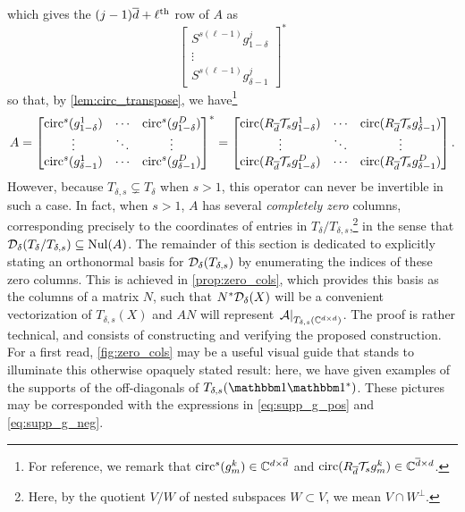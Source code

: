 which gives the $(j - 1) \overline{d} + \ell^{\text{th}}$ row of $A$ as \[\begin{bmatrix} S^{s (\ell - 1)} g_{1 - \delta}^j \\ \vdots \\ S^{s (\ell - 1)} g_{\delta - 1}^j \end{bmatrix}^*\] so that, by \cref{lem:circ_transpose}, we have\footnote{For reference, we remark that $\operatorname{circ}^s(g_m^k) \in \mathbb{C}^{d \times \overline{d}}$ and $\operatorname{circ}(R_{\overline{d}} \mathcal{T}_s g_m^k) \in \mathbb{C}^{\overline{d} \times d}$.} \begin{equation} A = \begin{bmatrix} \operatorname{circ}^s(g_{1 - \delta}^1) & \cdots & \operatorname{circ}^s(g_{1 - \delta}^D) \\ \vdots & \ddots & \vdots \\ \operatorname{circ}^s(g_{\delta - 1}^1) & \cdots & \operatorname{circ}^s(g_{\delta - 1}^D) \end{bmatrix}^* = \begin{bmatrix} \operatorname{circ}(R_{\overline{d}} \mathcal{T}_s g_{1 - \delta}^1) & \cdots & \operatorname{circ}(R_{\overline{d}} \mathcal{T}_s g_{\delta - 1}^1) \\ \vdots & \ddots & \vdots \\ \operatorname{circ}(R_{\overline{d}} \mathcal{T}_s g_{1 - \delta}^D) & \cdots & \operatorname{circ}(R_{\overline{d}} \mathcal{T}_s g_{\delta - 1}^D) \end{bmatrix}. \label{eq:A_block_ptych} \end{equation}  However, because $T_{\delta, s} \subsetneq T_\delta$ when $s > 1$, this operator can never be invertible in such a case.  In fact, when $s > 1$, $A$ has several \emph{completely zero} columns, corresponding precisely to the coordinates of entries in $T_\delta / T_{\delta, s}$,\footnote{Here, by the quotient $V / W$ of nested subspaces $W \subset V$, we mean $V \cap W^\perp$.} in the sense that $\mathcal{D}_\delta(T_\delta / T_{\delta, s}) \subseteq \operatorname{Nul}(A)$.  The remainder of this section is dedicated to explicitly stating an orthonormal basis for $\mathcal{D}_\delta(T_{\delta, s})$ by enumerating the indices of these zero columns.  This is achieved in \cref{prop:zero_cols}, which provides this basis as the columns of a matrix $N$, such that $N^* \mathcal{D}_\delta(X)$ will be a convenient vectorization of $T_{\delta, s}(X)$ and $A N$ will represent $\left.\mathcal{A}\right|_{T_{\delta, s}(\mathbb{C}^{d \times d})}$.  The proof is rather technical, and consists of constructing and verifying the proposed construction.  For a first read, \cref{fig:zero_cols} may be a useful visual guide that stands to illuminate this otherwise opaquely stated result: here, we have given examples of the supports of the off-diagonals of $T_{\delta, s}(\one \one^*)$.  These pictures may be corresponded with the expressions in \eqref{eq:supp_g_pos} and \eqref{eq:supp_g_neg}.


